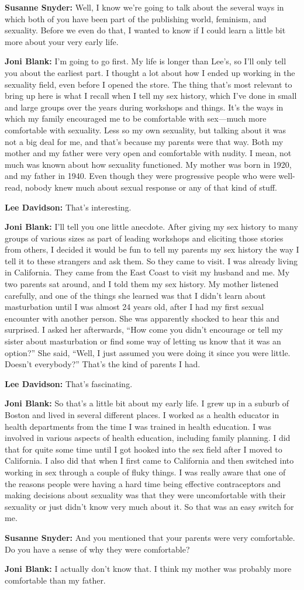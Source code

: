 \documentclass{article}
\begin{document}
\textbf{Susanne Snyder:} Well, I know we're going to talk about the several ways in which both of you have been part of the publishing world, feminism, and sexuality. Before we even do that, I wanted to know if I could learn a little bit more about your very early life.

\textbf{Joni Blank:} I'm going to go first. My life is longer than Lee's, so I'll only tell you about the earliest part. I thought a lot about how I ended up working in the sexuality field, even before I opened the store. The thing that's most relevant to bring up here is what I recall when I tell my sex history, which I've done in small and large groups over the years during workshops and things. It's the ways in which my family encouraged me to be comfortable with sex—much more comfortable with sexuality. Less so my own sexuality, but talking about it was not a big deal for me, and that's because my parents were that way. Both my mother and my father were very open and comfortable with nudity. I mean, not much was known about how sexuality functioned. My mother was born in 1920, and my father in 1940. Even though they were progressive people who were well-read, nobody knew much about sexual response or any of that kind of stuff.

\textbf{Lee Davidson:} That's interesting.

\textbf{Joni Blank:} I'll tell you one little anecdote. After giving my sex history to many groups of various sizes as part of leading workshops and eliciting those stories from others, I decided it would be fun to tell my parents my sex history the way I tell it to these strangers and ask them. So they came to visit. I was already living in California. They came from the East Coast to visit my husband and me. My two parents sat around, and I told them my sex history. My mother listened carefully, and one of the things she learned was that I didn't learn about masturbation until I was almost 24 years old, after I had my first sexual encounter with another person. She was apparently shocked to hear this and surprised. I asked her afterwards, “How come you didn't encourage or tell my sister about masturbation or find some way of letting us know that it was an option?” She said, “Well, I just assumed you were doing it since you were little. Doesn't everybody?” That's the kind of parents I had.

\textbf{Lee Davidson:} That's fascinating.

\textbf{Joni Blank:} So that's a little bit about my early life. I grew up in a suburb of Boston and lived in several different places. I worked as a health educator in health departments from the time I was trained in health education. I was involved in various aspects of health education, including family planning. I did that for quite some time until I got hooked into the sex field after I moved to California. I also did that when I first came to California and then switched into working in sex through a couple of fluky things. I was really aware that one of the reasons people were having a hard time being effective contraceptors and making decisions about sexuality was that they were uncomfortable with their sexuality or just didn't know very much about it. So that was an easy switch for me.

\textbf{Susanne Snyder:} And you mentioned that your parents were very comfortable. Do you have a sense of why they were comfortable?

\textbf{Joni Blank:} I actually don't know that. I think my mother was probably more comfortable than my father.
\end{document}
